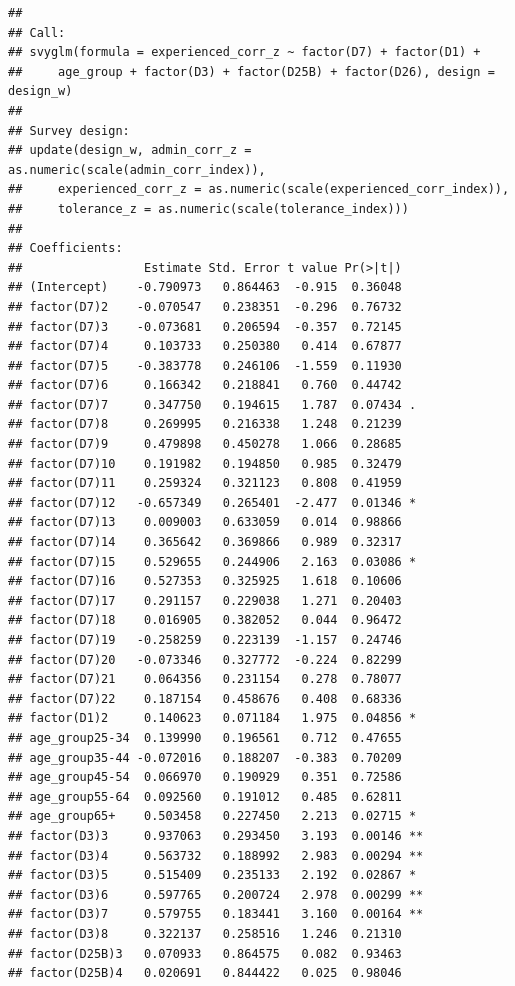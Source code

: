 \documentclass[
]{article}
\begin{document}
\begin{verbatim}
## 
## Call:
## svyglm(formula = experienced_corr_z ~ factor(D7) + factor(D1) + 
##     age_group + factor(D3) + factor(D25B) + factor(D26), design = design_w)
## 
## Survey design:
## update(design_w, admin_corr_z = as.numeric(scale(admin_corr_index)), 
##     experienced_corr_z = as.numeric(scale(experienced_corr_index)), 
##     tolerance_z = as.numeric(scale(tolerance_index)))
## 
## Coefficients:
##                 Estimate Std. Error t value Pr(>|t|)   
## (Intercept)    -0.790973   0.864463  -0.915  0.36048   
## factor(D7)2    -0.070547   0.238351  -0.296  0.76732   
## factor(D7)3    -0.073681   0.206594  -0.357  0.72145   
## factor(D7)4     0.103733   0.250380   0.414  0.67877   
## factor(D7)5    -0.383778   0.246106  -1.559  0.11930   
## factor(D7)6     0.166342   0.218841   0.760  0.44742   
## factor(D7)7     0.347750   0.194615   1.787  0.07434 . 
## factor(D7)8     0.269995   0.216338   1.248  0.21239   
## factor(D7)9     0.479898   0.450278   1.066  0.28685   
## factor(D7)10    0.191982   0.194850   0.985  0.32479   
## factor(D7)11    0.259324   0.321123   0.808  0.41959   
## factor(D7)12   -0.657349   0.265401  -2.477  0.01346 * 
## factor(D7)13    0.009003   0.633059   0.014  0.98866   
## factor(D7)14    0.365642   0.369866   0.989  0.32317   
## factor(D7)15    0.529655   0.244906   2.163  0.03086 * 
## factor(D7)16    0.527353   0.325925   1.618  0.10606   
## factor(D7)17    0.291157   0.229038   1.271  0.20403   
## factor(D7)18    0.016905   0.382052   0.044  0.96472   
## factor(D7)19   -0.258259   0.223139  -1.157  0.24746   
## factor(D7)20   -0.073346   0.327772  -0.224  0.82299   
## factor(D7)21    0.064356   0.231154   0.278  0.78077   
## factor(D7)22    0.187154   0.458676   0.408  0.68336   
## factor(D1)2     0.140623   0.071184   1.975  0.04856 * 
## age_group25-34  0.139990   0.196561   0.712  0.47655   
## age_group35-44 -0.072016   0.188207  -0.383  0.70209   
## age_group45-54  0.066970   0.190929   0.351  0.72586   
## age_group55-64  0.092560   0.191012   0.485  0.62811   
## age_group65+    0.503458   0.227450   2.213  0.02715 * 
## factor(D3)3     0.937063   0.293450   3.193  0.00146 **
## factor(D3)4     0.563732   0.188992   2.983  0.00294 **
## factor(D3)5     0.515409   0.235133   2.192  0.02867 * 
## factor(D3)6     0.597765   0.200724   2.978  0.00299 **
## factor(D3)7     0.579755   0.183441   3.160  0.00164 **
## factor(D3)8     0.322137   0.258516   1.246  0.21310   
## factor(D25B)3   0.070933   0.864575   0.082  0.93463   
## factor(D25B)4   0.020691   0.844422   0.025  0.98046   

\end{verbatim}
\end{document}
